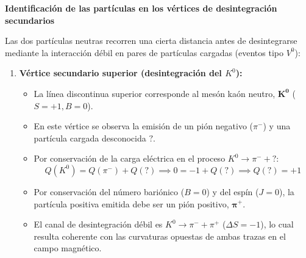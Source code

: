\begin{problema}
\textbf{Identificación de las partículas en los vértices de desintegración secundarios}

Las dos partículas neutras recorren una cierta distancia antes de desintegrarse mediante la interacción débil en pares de partículas cargadas (eventos tipo $V^0$):

\begin{enumerate}[label=\arabic*.]
    \item \textbf{Vértice secundario superior (desintegración del $K^0$):}
    \begin{itemize}
        \item La línea discontinua superior corresponde al mesón kaón neutro, $\mathbf{K^0}$ ($S = +1, B = 0$).
        \item En este vértice se observa la emisión de un pión negativo ($\pi^-$) y una partícula cargada desconocida $\mathbf{?}$.
        \item Por conservación de la carga eléctrica en el proceso $K^0 \to \pi^- + \mathbf{?}$:
        \begin{equation*}
            Q(K^0) = Q(\pi^-) + Q(\mathbf{?}) \implies 0 = -1 + Q(\mathbf{?}) \implies Q(\mathbf{?}) = +1
        \end{equation*}
        \item Por conservación del número bariónico ($B = 0$) y del espín ($J = 0$), la partícula positiva emitida debe ser un pión positivo, $\boldsymbol{\pi^+}$.
        \item El canal de desintegración débil es $K^0 \to \pi^- + \pi^+$ ($\Delta S = -1$), lo cual resulta coherente con las curvaturas opuestas de ambas trazas en el campo magnético.
    \end{itemize}


\end{enumerate}
\end{problema}
